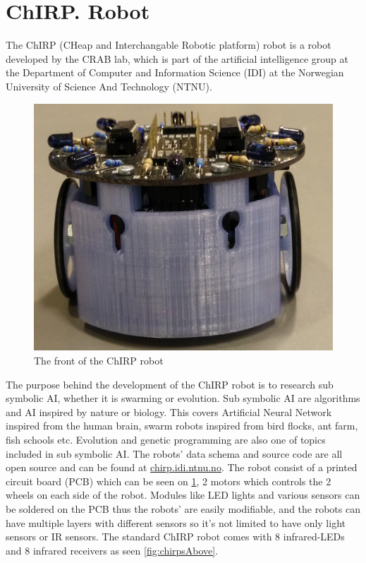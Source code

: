 \section{ChIRP. Robot}
The ChIRP (CHeap and Interchangable Robotic platform) robot is a robot developed by the CRAB lab, which is part of the artificial intelligence group at the Department of Computer and Information Science (IDI) at the Norwegian University of Science And Technology (NTNU).
\begin{figure}[h]
\label{fig:chirpsFront}
\centering
\includegraphics[width=0.8\linewidth]{images/chirpFront.jpg}
\caption{The front of the ChIRP robot}
\end{figure}
The purpose behind the development of the ChIRP robot is to research sub symbolic AI, whether it is swarming or evolution. Sub symbolic AI are algorithms and AI inspired by nature or biology. This covers Artificial Neural Network inspired from the human brain, swarm robots inspired from bird flocks, ant farm, fish schools etc. Evolution and genetic programming are also one of topics included in sub symbolic AI.
The robots' data schema and source code are all open source and can be found at \href{http://chirp.idi.ntnu.no}{chirp.idi.ntnu.no}. The robot consist of a printed circuit board (PCB) which can be seen on \ref{fig:chirpsFront}, 2 motors which controls the 2 wheels on each side of the robot.
Modules like LED lights and various sensors can be soldered on the PCB thus the robots' are easily modifiable, and the robots can have multiple layers with different sensors so it's not limited to have only light sensors or IR sensors. The standard ChIRP robot comes with 8 infrared-LEDs and 8 infrared receivers as seen \ref{fig:chirpsAbove}.
